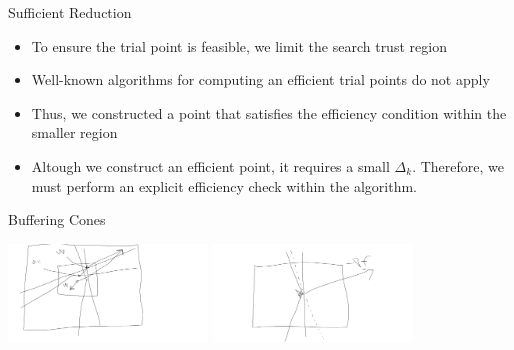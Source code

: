 \documentclass{beamer}
\newcommand{\dk}{{\Delta_k}}
\begin{document}

\begin{frame}{Sufficient Reduction}
	\begin{itemize}
		\item To ensure the trial point is feasible, we limit the search trust region
		\item Well-known algorithms for computing an efficient trial points do not apply
		\item Thus, we constructed a point that satisfies the efficiency condition within the smaller region
		\item Altough we construct an efficient point, it requires a small $\Delta_k$.
			Therefore, we must perform an explicit efficiency check within the algorithm.
	\end{itemize}
\end{frame}


\begin{frame}{Buffering Cones}
	\begin{center}
		\includegraphics[width=200px]{images/sufficient_reduction_in_cones.png}
		\includegraphics[width=200px]{images/no_sufficient_reduction_in_cones.png}
	\end{center}
\end{frame}
\end{document}

